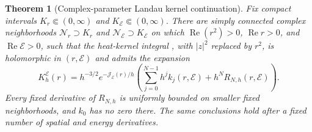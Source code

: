 \documentclass[11pt]{article}
\newtheorem{theorem}{Theorem}[section]
\newcommand{\cE}{\mathcal E}
\newcommand{\cJ}{\mathcal J}
\newcommand{\Rea}{\operatorname{Re}}
\begin{document}
\begin{theorem}[Complex-parameter Landau kernel continuation]
\label{thm:complex-kernel}
Fix compact intervals $K_r\Subset(0,\infty)$ and
$K_\cE\Subset(0,\infty)$.  There are simply connected complex
neighborhoods $\mathcal N_r\supset K_r$ and
$\mathcal N_\cE\supset K_\cE$ on which $\Rea(r^2)>0$,
$\Rea r>0$, and $\Rea\cE>0$, such that the heat-kernel integral
, with $|z|^2$ replaced by $r^2$, is holomorphic in
$(r,\cE)$ and admits the expansion
\begin{equation}\label{eq:complex-K-expansion-r}
 K_h^\cE(r)=h^{-3/2}e^{-\cJ_\cE(r)/h}
 \left(\sum_{j=0}^{N-1}h^jk_j(r,\cE)
       +h^NR_{N,h}(r,\cE)\right).
\end{equation}
Every fixed derivative of $R_{N,h}$ is uniformly bounded on smaller fixed
neighborhoods, and $k_0$ has no zero there.  The same conclusions hold
after a fixed number of spatial and energy derivatives.
\end{theorem}
\end{document}
